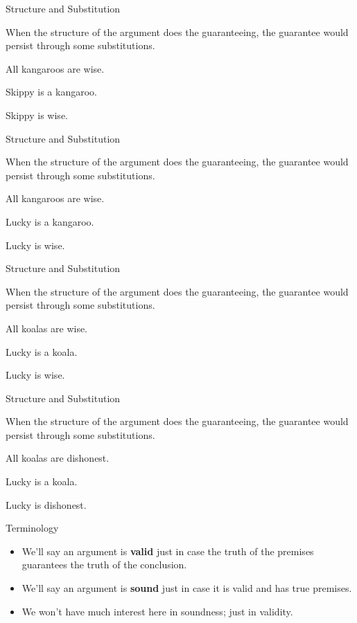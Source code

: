 \documentclass[
  ignorenonframetext,
]{beamer}
\providecommand{\tightlist}{%
  \setlength{\itemsep}{0pt}\setlength{\parskip}{0pt}}
\renewcommand{\,}{\text{, }}
\renewenvironment*{quote}	
	{\list{}{\rightmargin   \leftmargin} \item } 	
	{\endlist }
\newcommand{\DisplayArg}[2]{
\begin{enumerate}
{#1}
\end{enumerate}
\vspace{-6pt}
\hrulefill

\begin{quote}
{\normalfont #2}
\end{quote}
\vspace{12pt}
}
\begin{document}
\begin{frame}{Structure and Substitution}
\protect\hypertarget{structure-and-substitution}{}

When the structure of the argument does the guaranteeing, the guarantee
would persist through some substitutions.

\DisplayArg{ \item All kangaroos are wise. \item Skippy is a kangaroo. } { Skippy is wise. }

\end{frame}

\begin{frame}{Structure and Substitution}
\protect\hypertarget{structure-and-substitution-1}{}

When the structure of the argument does the guaranteeing, the guarantee
would persist through some substitutions.

\DisplayArg{ \item All kangaroos are wise. \item Lucky is a kangaroo. } { Lucky is wise. }

\end{frame}

\begin{frame}{Structure and Substitution}
\protect\hypertarget{structure-and-substitution-2}{}

When the structure of the argument does the guaranteeing, the guarantee
would persist through some substitutions.

\DisplayArg{ \item All koalas are wise. \item Lucky is a koala. } { Lucky is wise. }

\end{frame}

\begin{frame}{Structure and Substitution}
\protect\hypertarget{structure-and-substitution-3}{}

When the structure of the argument does the guaranteeing, the guarantee
would persist through some substitutions.

\DisplayArg{ \item All koalas are dishonest. \item Lucky is a koala. } { Lucky is dishonest. }

\end{frame}

\begin{frame}{Terminology}
\protect\hypertarget{terminology}{}

\begin{itemize}
\tightlist
\item
  We'll say an argument is \textbf{valid} just in case the truth of the
  premises guarantees the truth of the conclusion.
\item
  We'll say an argument is \textbf{sound} just in case it is valid and
  has true premises.
\item
  We won't have much interest here in soundness; just in validity.
\end{itemize}

\end{frame}
\end{document}
